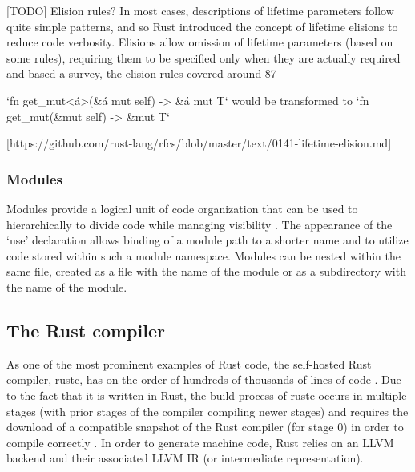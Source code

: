 [TODO] Elision rules?
In most cases, descriptions of lifetime parameters follow quite simple patterns, and so Rust introduced the concept of lifetime elisions to reduce code verbosity. Elisions allow omission of lifetime parameters (based on some rules), requiring them to be specified only when they are actually required and based a survey, the elision rules covered around 87%

`fn get\_mut<\'a>(\&\'a mut self) -> \&\'a mut T` would be transformed to `fn get\_mut(\&mut self) -> \&mut T`

[https://github.com/rust-lang/rfcs/blob/master/text/0141-lifetime-elision.md]

\subsubsection{Modules}
Modules provide a logical unit of code organization that can be used to hierarchically to divide code while managing visibility \cite{docmod15}. The appearance of the `use' declaration allows binding of a module path to a shorter name and to utilize code stored within such a module namespace. Modules can be nested within the same file, created as a file with the name of the module or as a subdirectory with the name of the module.


\subsection{The Rust compiler}
As one of the most prominent examples of Rust code, the self-hosted Rust compiler, rustc, has on the order of hundreds of thousands of lines of code \cite{openhub15}. Due to the fact that it is written in Rust, the build process of rustc occurs in multiple stages (with prior stages of the compiler compiling newer stages) and requires the download of a compatible snapshot of the Rust compiler (for stage 0) in order to compile correctly \cite{makefile15}. In order to generate machine code, Rust relies on an LLVM backend and their associated LLVM IR (or intermediate representation).

